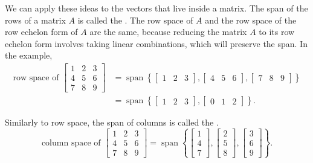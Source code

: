 \documentclass{ximera}
\begin{document}
We can apply these ideas to the vectors that live inside a matrix. The span of the rows of a matrix $A$ is called the \emph{}. The row space of $A$ and the row space of the row echelon form of $A$ are the same, because reducing the matrix $A$ to its row echelon form involves taking linear combinations, which will preserve the span. In the example,
\begin{equation*}
    \begin{split}
        \text{row space of }
        \begin{bmatrix}
            1 & 2 & 3 \\
            4 & 5 & 6 \\
            7 & 8 & 9
        \end{bmatrix}
        & = \operatorname{span} \left\{
        \begin{bmatrix}
            1 & 2 & 3
        \end{bmatrix}
        ,
        \begin{bmatrix}
            4 & 5 & 6
        \end{bmatrix}
        ,
        \begin{bmatrix}
            7 & 8 & 9
        \end{bmatrix}
        \right\} \\
        & = \operatorname{span} \left\{
        \begin{bmatrix}
            1 & 2 & 3
        \end{bmatrix}
        ,
        \begin{bmatrix}
            0 & 1 & 2
        \end{bmatrix}
        \right\} .
    \end{split}
\end{equation*}

Similarly to row space, the span of columns is called the
\emph{}.
\begin{equation*}
    \text{column space of }
    \begin{bmatrix}
        1 & 2 & 3 \\
        4 & 5 & 6 \\
        7 & 8 & 9
    \end{bmatrix}
    = \operatorname{span} \left\{
    \begin{bmatrix}
        1 \\ 4 \\ 7
    \end{bmatrix}
    ,
    \begin{bmatrix}
        2 \\ 5 \\ 8
    \end{bmatrix}
    ,
    \begin{bmatrix}
        3 \\ 6 \\ 9
    \end{bmatrix}
    \right\} .
\end{equation*}
\end{document}
